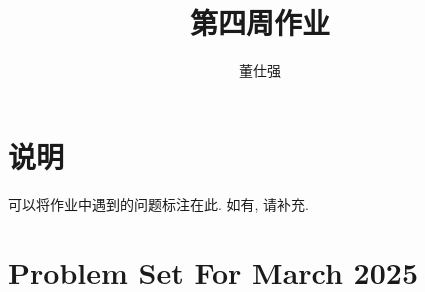 \documentclass[11pt]{ctexart}
\title{第四周作业}
\author{董仕强}
\theoremstyle{definition}
\numberwithin{equation}{section}
\theoremstyle{definition}
\theoremstyle{remark}
\begin{document}
\maketitle

\section{说明}

可以将作业中遇到的问题标注在此. 如有, 请补充.

\tableofcontents

\newpage


\section{Problem Set For March 2025}
\end{document}
